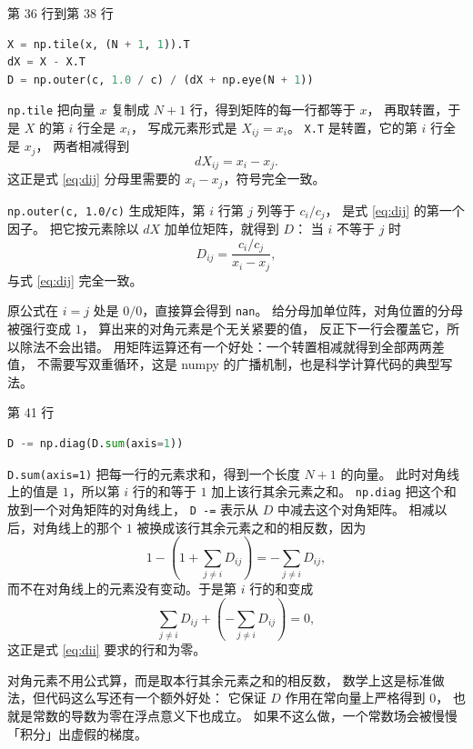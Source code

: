第 36 行到第 38 行

\begin{lstlisting}[language=Python]
X = np.tile(x, (N + 1, 1)).T
dX = X - X.T
D = np.outer(c, 1.0 / c) / (dX + np.eye(N + 1))
\end{lstlisting}

\texttt{np.tile} 把向量 $x$ 复制成 $N+1$ 行，得到矩阵的每一行都等于 $x$，
再取转置，于是 $X$ 的第 $i$ 行全是 $x_i$，
写成元素形式是 $X_{ij}=x_i$。
\texttt{X.T} 是转置，它的第 $i$ 行全是 $x_j$，
两者相减得到
\begin{equation}
dX_{ij}=x_i-x_j .
\end{equation}
这正是式 \eqref{eq:dij} 分母里需要的 $x_i-x_j$，符号完全一致。

\texttt{np.outer(c, 1.0/c)} 生成矩阵，第 $i$ 行第 $j$ 列等于 $c_i/c_j$，
是式 \eqref{eq:dij} 的第一个因子。
把它按元素除以 $dX$ 加单位矩阵，就得到 $D$：
当 $i$ 不等于 $j$ 时
\begin{equation}
D_{ij}=\frac{c_i/c_j}{x_i-x_j},
\end{equation}
与式 \eqref{eq:dij} 完全一致。

原公式在 $i=j$ 处是 $0/0$，直接算会得到 \texttt{nan}。
给分母加单位阵，对角位置的分母被强行变成 $1$，
算出来的对角元素是个无关紧要的值，
反正下一行会覆盖它，所以除法不会出错。
用矩阵运算还有一个好处：一个转置相减就得到全部两两差值，
不需要写双重循环，这是 numpy 的广播机制，也是科学计算代码的典型写法。

第 41 行

\begin{lstlisting}[language=Python]
D -= np.diag(D.sum(axis=1))
\end{lstlisting}

\texttt{D.sum(axis=1)} 把每一行的元素求和，得到一个长度 $N+1$ 的向量。
此时对角线上的值是 $1$，所以第 $i$ 行的和等于 $1$ 加上该行其余元素之和。
\texttt{np.diag} 把这个和放到一个对角矩阵的对角线上，
\texttt{D -=} 表示从 $D$ 中减去这个对角矩阵。
相减以后，对角线上的那个 $1$ 被换成该行其余元素之和的相反数，因为
\begin{equation}
1-\left(1+\sum_{j\ne i}D_{ij}\right)=-\sum_{j\ne i}D_{ij},
\end{equation}
而不在对角线上的元素没有变动。于是第 $i$ 行的和变成
\begin{equation}
\sum_{j\ne i}D_{ij}+\left(-\sum_{j\ne i}D_{ij}\right)=0 ,
\end{equation}
这正是式 \eqref{eq:dii} 要求的行和为零。

对角元素不用公式算，而是取本行其余元素之和的相反数，
数学上这是标准做法，但代码这么写还有一个额外好处：
它保证 $D$ 作用在常向量上严格得到 $0$，
也就是常数的导数为零在浮点意义下也成立。
如果不这么做，一个常数场会被慢慢「积分」出虚假的梯度。

